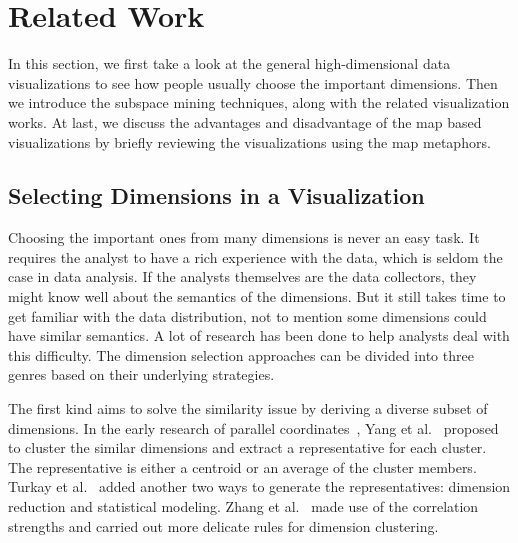 \section{Related Work}

In this section, we first take a look at the general high-dimensional data visualizations to see how people usually choose the important dimensions. Then we introduce the subspace mining techniques, along with the related visualization works. At last, we discuss the advantages and disadvantage of the map based visualizations by briefly reviewing the visualizations using the map metaphors.

\subsection{Selecting Dimensions in a Visualization}

Choosing the important ones from many dimensions is never an easy task. It requires the analyst to have a rich experience with the data, which is seldom the case in data analysis. If the analysts themselves are the data collectors, they might know well about the semantics of the dimensions. But it still takes time to get familiar with the data distribution, not to mention some dimensions could have similar semantics. A lot of research has been done to help analysts deal with this difficulty. The dimension selection approaches can be divided into three genres based on their underlying strategies.

The first kind aims to solve the similarity issue by deriving a diverse subset of dimensions. In the early research of parallel coordinates~\cite{DBLP:journals/vc/Inselberg85}, Yang et al.~\cite{DBLP:conf/infovis/YangPWR03} proposed to cluster the similar dimensions and extract a representative for each cluster. The representative is either a centroid or an average of the cluster members. Turkay et al.~\cite{DBLP:journals/tvcg/TurkayLLH12} added another two ways to generate the representatives: dimension reduction and statistical modeling. Zhang et al.~\cite{DBLP:conf/apvis/ZhangMM12, DBLP:journals/tvcg/ZhangMZM15} made use of the correlation strengths and carried out more delicate rules for dimension clustering. 

